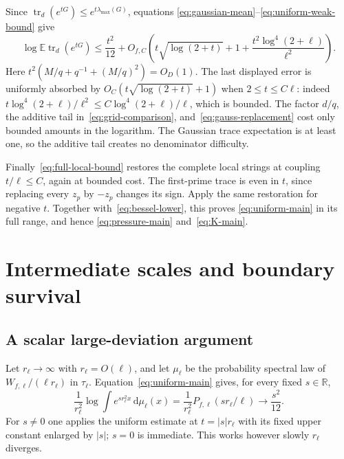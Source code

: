 \documentclass[11pt,reqno]{amsart}
\numberwithin{equation}{section}
\newcommand{\R}{\mathbb R}
\newcommand{\E}{\mathbb E}
\newcommand{\tr}{\operatorname{tr}}
\newcommand{\dd}{\,\mathrm d}
\newcommand{\abs}[1]{\lvert#1\rvert}
\begin{document}
Since $\tr_d(e^{tG})\le e^{t\lambda_{\max}(G)}$, equations
\eqref{eq:gaussian-mean}--\eqref{eq:uniform-weak-bound} give
\[
 \log\E\tr_d(e^{tG})
 \le\frac{t^2}{12}+O_{f,C}\left(
       t\sqrt{\log(2+t)}+1+
                \frac{t^2\log^4(2+\ell)}{\ell^2}\right).
\]
Here $t^2(M/q+q^{-1}+(M/q)^2)=O_D(1)$.
The last displayed error is uniformly absorbed by
$O_C(t\sqrt{\log(2+t)}+1)$ when $2\le t\le C\ell$:
indeed $t\log^4(2+\ell)/\ell^2\le
C\log^4(2+\ell)/\ell$, which is bounded.
The factor $d/q$, the additive tail in~\eqref{eq:grid-comparison},
and~\eqref{eq:gauss-replacement} cost only bounded amounts in
the logarithm. The Gaussian trace expectation is at least one,
so the additive tail creates no denominator difficulty.

Finally~\eqref{eq:full-local-bound} restores the complete local
strings at coupling $t/\ell\le C$, again at bounded cost.
The first-prime trace is even in $t$, since replacing every
$z_p$ by $-z_p$ changes its sign. Apply the same restoration for
negative $t$. Together with~\eqref{eq:bessel-lower}, this proves
\eqref{eq:uniform-main} in its full range, and hence
\eqref{eq:pressure-main} and~\eqref{eq:K-main}.

\section{Intermediate scales and boundary survival}\label{sec:deviations}

\subsection*{A scalar large-deviation argument}

Let $r_\ell\to\infty$ with $r_\ell=O(\ell)$, and let $\mu_\ell$
be the probability spectral law of $W_{f,\ell}/(\ell r_\ell)$
in $\tau_\ell$. Equation~\eqref{eq:uniform-main} gives, for every
fixed $s\in\R$,
\begin{equation}\label{eq:scaled-mgf}
 \frac1{r_\ell^2}\log\int e^{sr_\ell^2x}\dd\mu_\ell(x)
   =\frac1{r_\ell^2}P_{f,\ell}(sr_\ell/\ell)
   \longrightarrow\frac{s^2}{12}.
\end{equation}
For $s\ne0$ one applies the uniform estimate at $t=\abs s r_\ell$
with its fixed upper constant enlarged by $\abs s$; $s=0$ is
immediate. This works however slowly $r_\ell$ diverges.
\end{document}
